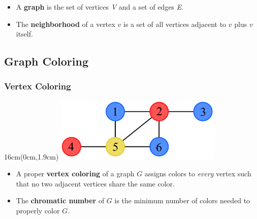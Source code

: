 \documentclass[xcolor=dvipsnames,aspectratio=1610]{beamer}
\newcommand{\exampleheight}{1.9cm}
\newcommand{\examplewidth}{16cm}
\begin{document}
\begin{frame}
    \vspace{4cm}

    \vfill

    \begin{itemize}
      \item<1-4> A \textbf{graph} is the set of vertices \emph{V} and a set of edges \emph{E}.
      \item<2-4> The \textbf{neighborhood} of a vertex $v$ is a set of all vertices adjacent to $v$ plus $v$ itself.
    \end{itemize}

  \end{frame}

  \subsection{Graph Coloring}

  \begin{frame}
    \frametitle{Vertex Coloring}

    \begin{textblock*}{\examplewidth}(0cm,\exampleheight) %
      \centering
      \includegraphics[width=8cm]{../figures/example-vcp.pdf}
    \end{textblock*}

    \vspace{4cm}
    \vfill

    \begin{itemize}
      \item A proper \textbf{vertex coloring} of a graph $G$ assigns colors to \emph{every} vertex such that no two adjacent vertices share the same color.
      \item The \textbf{chromatic number} of $G$ is the minimum number of colors needed to properly color $G$.
    \end{itemize}
  \end{frame}
\end{document}
